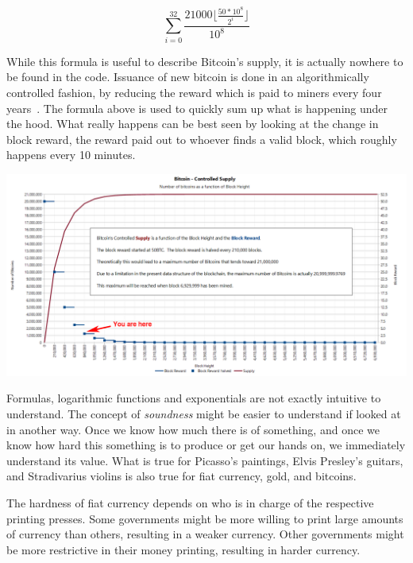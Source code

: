 \begin{center}
  \centering
  \begin{equation}
  \sum\limits_{i=0}^{32} \frac{21000 \lfloor \frac{50*10^8}{2^i} \rfloor}{10^8}
  \end{equation}
  \label{fig:supply-formula-white}
\end{center}

While this formula is useful to describe Bitcoin's supply, it is actually
nowhere to be found in the code. Issuance of new bitcoin is done in an
algorithmically controlled fashion, by reducing the reward which is paid to
miners every four years~\cite{btcwiki:supply}. The formula above is used to
quickly sum up what is happening under the hood. What really happens can be best
seen by looking at the change in block reward, the reward paid out to whoever
finds a valid block, which roughly happens every 10 minutes.

\begin{center}
  \includegraphics[width=\textwidth]{assets/images/you-are-here.png}
  \label{fig:you-are-here.png}
\end{center}

Formulas, logarithmic functions and exponentials are not exactly
intuitive to understand. The concept of \textit{soundness} might be easier to
understand if looked at in another way. Once we know how much there is
of something, and once we know how hard this something is to produce or
get our hands on, we immediately understand its value. What is true for
Picasso's paintings, Elvis Presley's guitars, and Stradivarius violins
is also true for fiat currency, gold, and bitcoins.

The hardness of fiat currency depends on who is in charge of the
respective printing presses. Some governments might be more willing to
print large amounts of currency than others, resulting in a weaker
currency. Other governments might be more restrictive in their money
printing, resulting in harder currency.

